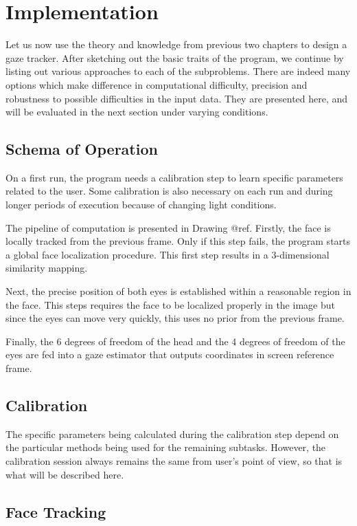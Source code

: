 \chapter{Implementation}

Let us now use the theory and knowledge from previous two chapters to design a gaze tracker.
After sketching out the basic traits of the program, we continue by listing out various approaches to each of the subproblems.
There are indeed many options which make difference in computational difficulty, precision and robustness to possible difficulties in the input data.
They are presented here, and will be evaluated in the next section under varying conditions.

\section{Schema of Operation}

On a first run, the program needs a calibration step to learn specific parameters related to the user.
Some calibration is also necessary on each run and during longer periods of execution because of changing light conditions.

The pipeline of computation is presented in Drawing @ref.
Firstly, the face is locally tracked from the previous frame.
Only if this step fails, the program starts a global face localization procedure.
This first step results in a 3-dimensional similarity mapping.

Next, the precise position of both eyes is established within a reasonable region in the face.
This steps requires the face to be localized properly in the image but since the eyes can move very quickly, this uses no prior from the previous frame.

Finally, the 6 degrees of freedom of the head and the 4 degrees of freedom of the eyes are fed into a gaze estimator that outputs coordinates in screen reference frame.

\section{Calibration}

The specific parameters being calculated during the calibration step depend on the particular methods being used for the remaining subtasks.
However, the calibration session always remains the same from user's point of view, so that is what will be described here.

\section{Face Tracking}

